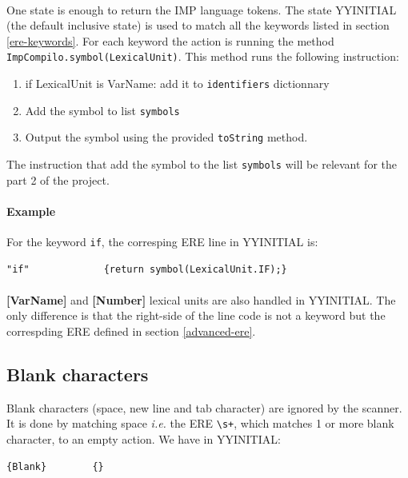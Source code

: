 \documentclass[letterpaper]{article}
\begin{document}
\label{impl-keywords}

\paragraph{}

One state is enough to return the IMP language tokens.
The state YYINITIAL (the default inclusive state) is used to match
all the keywords listed in section \ref{ere-keywords}. For each keyword
the action is running the method \texttt{ImpCompilo.symbol(LexicalUnit)}.
This method runs the following instruction:
\begin{enumerate}
    \item if LexicalUnit is VarName: add it to \texttt{identifiers} dictionnary
    \item Add the symbol to list \texttt{symbols}
    \item Output the symbol using the provided \texttt{toString} method.
\end{enumerate}

The instruction that add the symbol to the list \texttt{symbols}
will be relevant for the part 2 of the project.

\paragraph{Example}

For the keyword \texttt{if}, the corresping ERE line in YYINITIAL is:

\begin{lstlisting}[frame=single]
"if"             {return symbol(LexicalUnit.IF);}
\end{lstlisting}

\paragraph{}
\textbf{[VarName]} and \textbf{[Number]} lexical units
are also handled in YYINITIAL.
The only difference is that the right-side of the line code is not a keyword
but the correspding ERE defined in section \ref{advanced-ere}.

\subsection{Blank characters}

Blank characters (space, new line and tab character)
are ignored by the scanner. It is
done by matching space \textit{i.e.} the ERE \texttt{\textbackslash s+},
which matches
1 or more blank character, to an empty action. We have in YYINITIAL:
\begin{lstlisting}[frame=single]
{Blank}        {}
\end{lstlisting}
\end{document}
